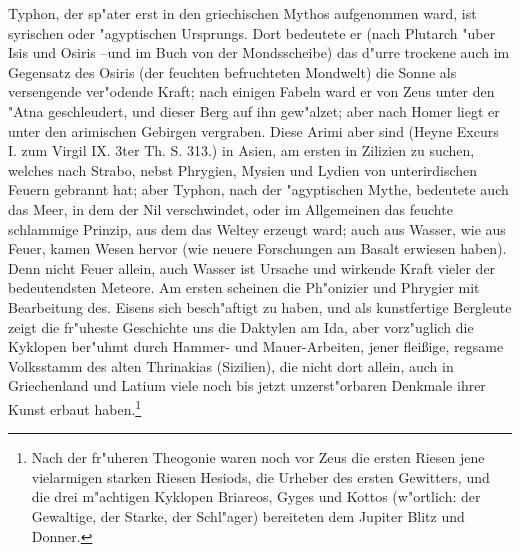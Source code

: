 \documentclass[a4paper, 11pt, oneside, polutonikogreek, german]{article}
\begin{document}
Typhon, der sp"ater erst in den griechischen Mythos aufgenommen ward, ist syrischen oder "agyptischen Ursprungs. Dort bedeutete er (nach Plutarch "uber Isis und Osiris --und im Buch von der Mondsscheibe) das d"urre trockene auch im Gegensatz des Osiris (der feuchten befruchteten Mondwelt) die Sonne als versengende ver"odende Kraft; nach einigen Fabeln ward er von Zeus unter den "Atna geschleudert, und dieser Berg auf ihn gew"alzet; aber nach Homer liegt er unter den arimischen Gebirgen vergraben. Diese Arimi aber sind (Heyne Excurs I. zum Virgil IX. 3ter Th. S. 313.) in Asien, am ersten in Zilizien zu suchen, welches nach Strabo, nebst Phrygien, Mysien und Lydien von unterirdischen Feuern gebrannt hat; aber Typhon, nach der "agyptischen Mythe, bedeutete auch das Meer, in dem der Nil verschwindet, oder im Allgemeinen das feuchte schlammige Prinzip, aus dem das Weltey erzeugt ward; auch aus Wasser, wie aus Feuer, kamen Wesen hervor (wie neuere Forschungen am Basalt erwiesen haben). Denn nicht Feuer allein, auch Wasser ist Ursache und wirkende Kraft vieler der bedeutendsten Meteore. Am ersten scheinen die Ph"onizier und Phrygier mit Bearbeitung des. Eisens sich besch"aftigt zu haben, und als kunstfertige Bergleute zeigt die fr"uheste Geschichte uns die Daktylen am Ida, aber vorz"uglich die Kyklopen ber"uhmt durch Hammer- und Mauer-Arbeiten, jener fleißige, regsame Volksstamm des alten Thrinakias (Sizilien), die nicht dort allein, auch in Griechenland und Latium viele noch bis jetzt unzerst"orbaren Denkmale ihrer Kunst erbaut haben.\footnote{Nach der fr"uheren Theogonie waren noch vor Zeus die ersten Riesen jene vielarmigen starken Riesen Hesiods, die Urheber des ersten Gewitters, und die drei m"achtigen Kyklopen Briareos, Gyges und Kottos (w"ortlich: der Gewaltige, der Starke, der Schl"ager) bereiteten dem Jupiter Blitz und Donner.}
\end{document}
